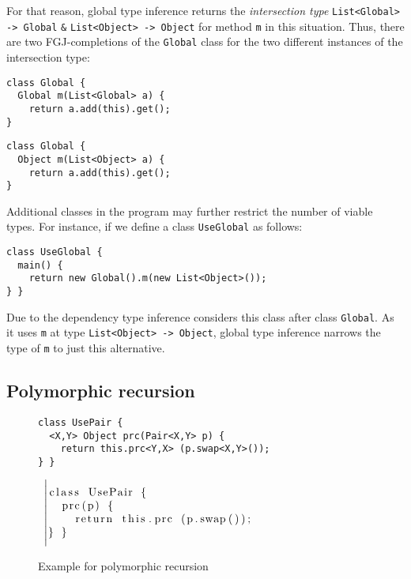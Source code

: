 For that reason, global type inference returns the \emph{intersection type}
\texttt{List<Global> -> Global} \verb!&! \texttt{List<Object> -> Object}
for method \texttt{m} in this situation. Thus, there are two
FGJ-completions of the \texttt{Global} class for the two different
instances of the intersection type:
\begin{center}
  \begin{minipage}{0.49\linewidth}
\begin{lstlisting}
class Global {
  Global m(List<Global> a) {
    return a.add(this).get();
}
\end{lstlisting}
  \end{minipage}
  \begin{minipage}{0.49\linewidth}
\begin{lstlisting}
class Global {
  Object m(List<Object> a) {
    return a.add(this).get();
}
\end{lstlisting}
  \end{minipage}
\end{center}
Additional classes in the program may further restrict the number of
viable types. For instance, if we define a class \texttt{UseGlobal} as
follows:
\begin{lstlisting}
class UseGlobal {
  main() {
    return new Global().m(new List<Object>());
} }
\end{lstlisting}
Due to the dependency type inference considers this class after class
\texttt{Global}. As it uses \texttt{m} at type
\texttt{List<Object> -> Object}, global type inference narrows the
type of \texttt{m} to just this alternative.

\subsection{Polymorphic recursion}
\label{sec:polym-recurs}
\begin{figure}[tp]
  \begin{minipage}{0.49\linewidth}
\begin{lstlisting}
class UsePair {
  <X,Y> Object prc(Pair<X,Y> p) {
    return this.prc<Y,X> (p.swap<X,Y>());
} }
\end{lstlisting}
  \end{minipage}
  ~$\left|
  \begin{minipage}{0.49\linewidth}
\begin{lstlisting}
class UsePair {
  prc(p) {
    return this.prc (p.swap());

} }
\end{lstlisting}
  \end{minipage}\right.$
  \caption{Example for polymorphic recursion}
  \label{fig:examples-poly-rec}
\end{figure}

